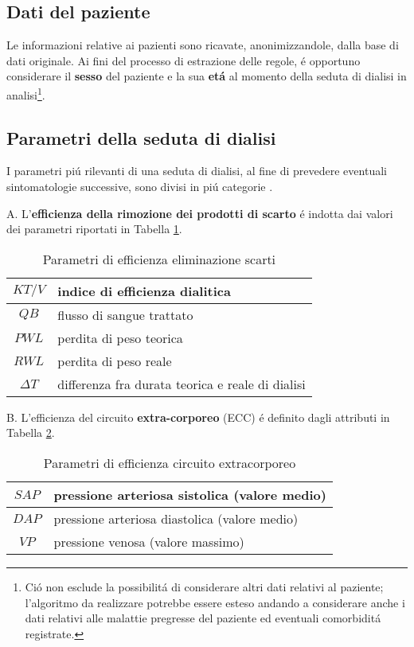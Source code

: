 \documentclass{acm_proc_article-sp}
\begin{document}
\subsection{Dati del paziente}
Le informazioni relative ai pazienti sono ricavate, anonimizzandole, dalla base di dati originale. Ai fini del processo di estrazione delle regole, \'e opportuno considerare il \textbf{sesso} del paziente e la sua \textbf{et\'a} al momento della seduta di dialisi in analisi\footnote{Ci\'o non esclude la possibilit\'a di considerare altri dati relativi al paziente; l'algoritmo da realizzare potrebbe essere esteso andando a considerare anche i dati relativi alle malattie pregresse del paziente ed eventuali comorbidit\'a registrate.}.

\subsection{Parametri della seduta di dialisi}
I parametri pi\'u rilevanti di una seduta di dialisi, al fine di prevedere eventuali sintomatologie successive, sono divisi in pi\'u categorie \cite{bellazziintelligent}  \cite{pmid15749092}.

A. L'\textbf{efficienza della rimozione dei prodotti di scarto} \'e indotta dai valori dei parametri riportati in Tabella \ref{table:parametri-1}.

\begin{table}[h]
\centering
\begin{tabular}{|c|l|} \hline
$KT/V$ & indice di efficienza dialitica\\ \hline
$QB$ & flusso di sangue trattato\\ \hline
$PWL$ & perdita di peso teorica \\ \hline
$RWL$ & perdita di peso reale \\ \hline
$\Delta T$ & differenza fra durata teorica e reale di dialisi\\
\hline\end{tabular}
\caption{Parametri di efficienza eliminazione scarti}
\label{table:parametri-1}
\end{table}

B. L'efficienza del circuito \textbf{extra-corporeo} (ECC) \'e definito dagli attributi in Tabella \ref{table:parametri-2}.

\begin{table}[h]
\centering
\begin{tabular}{|c|l|} \hline
$SAP$ & pressione arteriosa sistolica (valore medio)\\ \hline
$DAP$ & pressione arteriosa diastolica (valore medio)\\ \hline
$VP$ & pressione venosa (valore massimo) \\
\hline\end{tabular}
\caption{Parametri di efficienza circuito extracorporeo}
\label{table:parametri-2}
\end{table}
\end{document}
